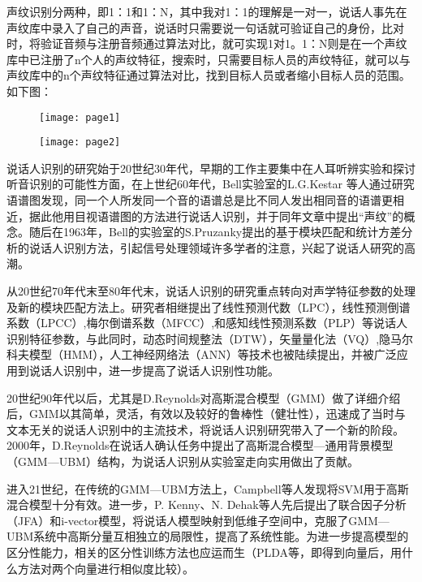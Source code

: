 \documentclass{article}
\begin{document}
声纹识别分两种，即1：1和1：N，其中我对1：1的理解是一对一，说话人事先在声纹库中录入了自己的声音，说话时只需要说一句话就可验证自己的身份，比对时，将验证音频与注册音频通过算法对比，就可实现1对1。1：N则是在一个声纹库中已注册了n个人的声纹特征，搜索时，只需要目标人员的声纹特征，就可以与声纹库中的n个声纹特征通过算法对比，找到目标人员或者缩小目标人员的范围。如下图：\par 
\begin{figure}[h!]
	\centering
	\texttt{[image: page1]} 
\end{figure}
\begin{figure}[h!]
	\centering
	\texttt{[image: page2]} 
\end{figure}
说话人识别的研究始于20世纪30年代，早期的工作主要集中在人耳听辨实验和探讨听音识别的可能性方面，在上世纪60年代，Bell实验室的L.G.Kestar 等人通过研究语谱图发现，同一个人所发同一个音的语谱总是比不同人发出相同音的语谱更相近，据此他用目视语谱图的方法进行说话人识别，并于同年文章中提出“声纹”的概念。随后在1963年，Bell的实验室的S.Pruzanky提出的基于模块匹配和统计方差分析的说话人识别方法，引起信号处理领域许多学者的注意，兴起了说话人研究的高潮。\par
从20世纪70年代末至80年代末，说话人识别的研究重点转向对声学特征参数的处理及新的模块匹配方法上。研究者相继提出了线性预测代数（LPC），线性预测倒谱系数（LPCC）,梅尔倒谱系数（MFCC）,和感知线性预测系数（PLP）等说话人识别特征参数，与此同时，动态时间规整法（DTW），矢量量化法（VQ）,隐马尔科夫模型（HMM），人工神经网络法（ANN）等技术也被陆续提出，并被广泛应用到说话人识别中，进一步提高了说话人识别性功能。\par 
20世纪90年代以后，尤其是D.Reynolds对高斯混合模型（GMM）做了详细介绍后，GMM以其简单，灵活，有效以及较好的鲁棒性（健壮性），迅速成了当时与文本无关的说话人识别中的主流技术，将说话人识别研究带入了一个新的阶段。2000年，D.Reynolds在说话人确认任务中提出了高斯混合模型—通用背景模型（GMM—UBM）结构，为说话人识别从实验室走向实用做出了贡献。\par 
进入21世纪，在传统的GMM—UBM方法上，Campbell等人发现将SVM用于高斯混合模型十分有效。进一步，P. Kenny、N. Dehak等人先后提出了联合因子分析（JFA）和i-vector模型，将说话人模型映射到低维子空间中，克服了GMM—UBM系统中高斯分量互相独立的局限性，提高了系统性能。为进一步提高模型的区分性能力，相关的区分性训练方法也应运而生（PLDA等，即得到向量后，用什么方法对两个向量进行相似度比较）。\par 
\end{document}
